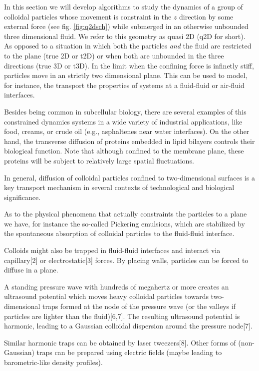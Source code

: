 \documentclass[ twoside,openright,titlepage,numbers=noenddot,%
headinclude,footinclude,cleardoublepage=empty,abstract=on,
BCOR=5mm,paper=a4,fontsize=11pt, dvipsnames
]{scrreprt}
\begin{document}
In this section we will develop algorithms to study the dynamics of a group of colloidal particles whose movement is constraint in the $z$ direction by some external force (see fig. \ref{fig:q2dsch}) while submerged in an otherwise unbounded three dimensional fluid. We refer to this geometry as quasi 2D (q2D for short). As opposed to a situation in which both the particles \emph{and} the fluid are restricted to the plane (true 2D or t2D) or when both are unbounded in the three directions (true 3D or t3D). In the limit when the confining force is infinetly stiff, particles move in an strictly two dimensional plane. This can be used to model, for instance, the transport the properties of systems at a fluid-fluid or air-fluid interfaces. 

Besides being common in subcellular biology, there are several examples of this constrained dynamics systems in a wide variety of industrial applications, like food, creams, or crude oil (e.g., asphaltenes near water interfaces).
On the other hand, the transverse diffusion of proteins embedded in lipid bilayers controls their biological function\cite{MembraneDiffusion_Review}.
Note that although confined to the membrane plane, these proteins will be subject to relatively large spatial fluctuations.

In general, diffusion of colloidal particles confined to two-dimensional surfaces is a key transport mechanism in several contexts of technological and biological significance.

As to the physical phenomena that actually constraints the particles to a plane we have, for instance the so-called Pickering emulsions, which are stabilized by the spontaneous absorption of colloidal particles to the fluid-fluid interface.

Colloids might also be trapped in fluid-fluid interfaces and interact via capillary[2] or electrostatic[3] forces. By placing walls, particles can be forced to diffuse in a plane\cite{Diffusion2D_Experiments_Rice}. 

A standing pressure wave with hundreds of megahertz or more creates an ultrasound potential which moves heavy colloidal particles towards two-dimensional traps formed at the node of the pressure wave (or the valleys if particles are lighter than the fluid)[6,7]. The resulting ultrasound potential is harmonic, leading to a Gaussian colloidal dispersion around the pressure node[7].

Similar harmonic traps can be obtained by laser tweezers[8]. Other forms of (non-Gaussian) traps can be prepared using electric fields (maybe leading to barometric-like density profiles).
\end{document}
